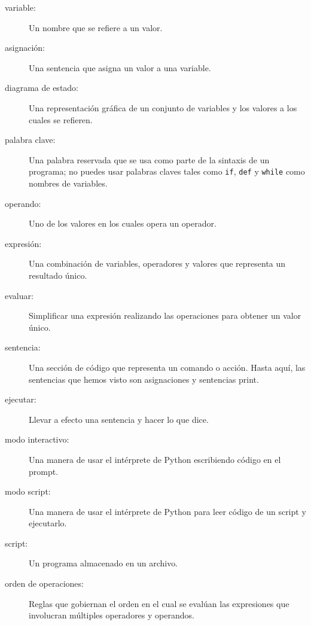 \documentclass[10pt]{book}
\begin{document}
\begin{description}

\item[variable:]  Un nombre que se refiere a un valor.

\item[asignación:]  Una sentencia que asigna un valor a una variable.

\item[diagrama de estado:]  Una representación gráfica de un conjunto de variables y los
valores a los cuales se refieren.

\item[palabra clave:]  Una palabra reservada que se usa como parte de la sintaxis
de un programa; no puedes usar palabras claves tales como {\tt if}, {\tt  def} y {\tt while} como
nombres de variables.

\item[operando:]  Uno de los valores en los cuales opera un operador.

\item[expresión:]  Una combinación de variables, operadores y valores que
representa un resultado único.

\item[evaluar:]  Simplificar una expresión realizando las operaciones
para obtener un valor único.

\item[sentencia:]  Una sección de código que representa un comando o acción.  Hasta
aquí, las sentencias que hemos visto son asignaciones y sentencias print.

\item[ejecutar:]  Llevar a efecto una sentencia y hacer lo que dice.

\item[modo interactivo:] Una manera de usar el intérprete de Python
escribiendo código en el prompt.

\item[modo script:] Una manera de usar el intérprete de Python para leer
código de un script y ejecutarlo.

\item[script:] Un programa almacenado en un archivo.

\item[orden de operaciones:]  Reglas que gobiernan el orden en el cual
se evalúan las expresiones que involucran múltiples operadores y operandos.


\end{description}
\end{document}
